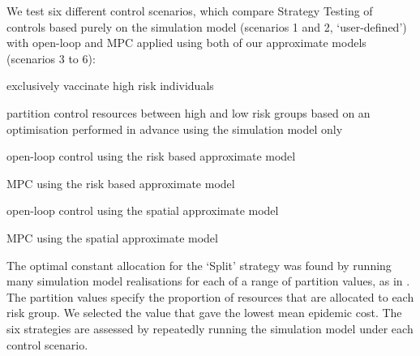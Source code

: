 We test six different control scenarios, which compare Strategy Testing of controls based purely on the simulation model (scenarios 1 and 2, `user-defined') with open-loop and MPC applied using both of our approximate models (scenarios 3 to 6):
\begin{description}
    \setlength{\itemsep}{3pt}%
    \setlength{\parskip}{3pt}%
    \setlength{\parsep}{3pt}%
    \item[1. `High':] exclusively vaccinate high risk individuals
    \item[2. `Split':] partition control resources between high and low risk groups based on an optimisation performed in advance using the simulation model only
    \item[3. `Risk OL':] open-loop control using the risk based approximate model
    \item[4. `Risk MPC':] MPC using the risk based approximate model
    \item[5. `Space OL':] open-loop control using the spatial approximate model
    \item[6. `Space MPC':] MPC using the spatial approximate model
\end{description}

The optimal constant allocation for the `Split' strategy was found by running many simulation model realisations for each of a range of partition values, as in \citet{cunniffe_optimising_2015}. The partition values specify the proportion of resources that are allocated to each risk group. We selected the value that gave the lowest mean epidemic cost. The six strategies are assessed by repeatedly running the simulation model under each control scenario.

